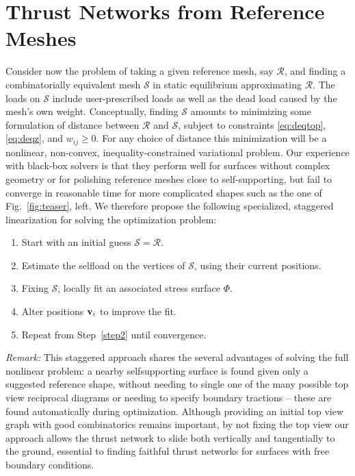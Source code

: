 \documentclass[review]{acmsiggraph}
\def\SS{{\mathcal S}}
\def\RR{{\mathcal R}}
\begin{document}
\section{Thrust Networks from Reference Meshes} \label{sec:opt}

Consider now the problem of taking a given reference mesh, say $\RR$, and
finding a combinatorially equivalent mesh $\SS$ in static equilibrium
approximating $\RR$. The loads on $\SS$ include user-prescribed loads as
well as the dead load caused by the mesh's own weight. Conceptually,
finding $\SS$ amounts to minimizing some formulation of distance between
$\RR$ and $\SS$, subject to constraints \eqref{eq:deqtop},
\eqref{eq:deqz}, and $w_{ij} \geq 0$. For any choice of distance this
minimization will be a nonlinear, non-convex, inequality-constrained
variational problem. Our experience with black-box solvers 
\cite{ipopt} is that
they perform well for surfaces without complex geometry or for
polishing reference meshes close to self-supporting, but fail to converge
in reasonable time for more complicated shapes such as the one of
Fig.~\ref{fig:teaser}, left.
We therefore propose the following specialized, staggered linearization for solving the optimization problem:


\begin{enumerate}\itemsep-\parsep\setcounter{enumi}{-1}

\item Start with an initial guess $\SS = \RR$.

\item \label{step2} Estimate the self\dash load on the vertices of $\SS$,
using their current positions.

\item \label{step3} Fixing $\SS$, locally fit an associated stress surface $\Phi$.

\item \label{step4} Alter positions ${\mathbf v}_i$ to improve the fit.

\item Repeat from Step~\ref{step2} until convergence.

\end{enumerate}

{\it Remark:} This staggered approach shares the several advantages of
solving the full nonlinear problem: a nearby self\dash supporting surface
is found given only a suggested reference shape, without needing to single
one of the many possible top view reciprocal diagrams or needing to
specify boundary tractions -- these are found automatically during
optimization. Although providing an initial top view graph with good
combinatorics remains important, by not fixing the top view our approach
allows the thrust network to slide both vertically and tangentially to the
ground, essential to finding faithful thrust networks for surfaces with
free boundary conditions.
\end{document}
